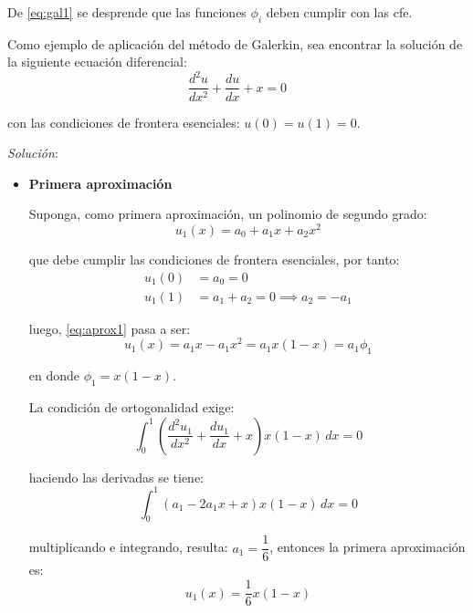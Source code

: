 De \eqref{eq:gal1} se desprende que las funciones $\phi_i$ deben cumplir con las \acrlong{cfe}.

\begin{example}
	Como ejemplo de aplicación del método de Galerkin, sea encontrar la solución de la siguiente ecuación diferencial:
	\begin{equation}
		\dfrac{d^2u}{dx^2} + \dfrac{du}{dx} + x = 0
		\label{eq:ejm1}
	\end{equation}
	
	con las condiciones de frontera esenciales: $u(0) = u(1) = 0$.\par
	
\textit{Solución}:

\vspace{2mm}
	\begin{itemize}
		\item \textbf{Primera aproximación}
		
		Suponga, como primera aproximación, un polinomio de segundo grado:
		\begin{equation}
			u_1(x) = a_0 + a_1x + a_2 x^2
			\label{eq:aprox1}
		\end{equation}
		
		que debe cumplir las condiciones de frontera esenciales, por tanto:
		\begin{equation}
			\begin{split}
				u_1(0) &= a_0 = 0 \\
				u_1(1) &= a_1 + a_2 = 0 \implies a_2 = -a_1
			\end{split}
		\end{equation}
		
		luego, \eqref{eq:aprox1} pasa a ser:
		\begin{equation}
			u_1(x) = a_1x - a_1x^2 = a_1 x (1 - x) = a_1 \phi_1
		\end{equation}
		
		en donde $\phi_1 = x (1 - x)$.
		
		La condición de ortogonalidad exige:
		\begin{equation}
			\int_{0}^{1} \left(\dfrac{d^2u_1}{dx^2} + \dfrac{du_1}{dx} + x\right) x (1 - x) \, dx = 0
		\end{equation}
		
		haciendo las derivadas se tiene:
		\begin{equation}
			\int_{0}^{1} \left(a_1 - 2a_1x + x \right) x (1 - x) \, dx = 0
		\end{equation}
		
		multiplicando e integrando, resulta: $a_1 = \dfrac{1}{6}$, entonces la primera aproximación es:
		\begin{equation}
			u_1(x) = \dfrac{1}{6} x (1 - x)
		\end{equation}
		

\end{itemize}
\end{example}
